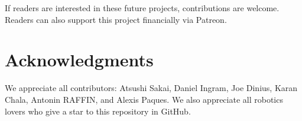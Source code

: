 \documentclass{bmvc2k}
\begin{document}
If readers are interested in these future projects, contributions are welcome.
Readers can also support this project financially via Patreon\cite{patreon}.

\section{Acknowledgments}

We appreciate all contributors: Atsushi Sakai\cite{auther5}, Daniel Ingram\cite{auther1}, Joe Dinius\cite{auther2}, Karan Chala\cite{auther3}, Antonin RAFFIN\cite{auther4}, and Alexis Paques\cite{auther6}.
We also appreciate all robotics lovers who give a star to this repository in GitHub.



\end{document}
